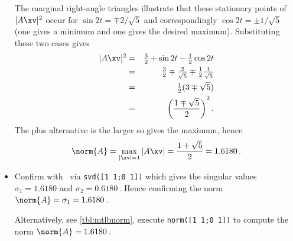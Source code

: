\begin{example}
\begin{itemize}
The marginal right-angle triangles illustrate that these stationary points of~\(|A\xv|^2\) occur for \(\sin 2t=\mp2/\sqrt5\) and correspondingly \(\cos2t=\pm1/\sqrt5\) (one gives a minimum and one gives the desired maximum).
Substituting these two cases gives
\begin{eqnarray*}
|A\xv|^2&=&\tfrac32+\sin 2t-\tfrac12\cos 2t
\\&=&\tfrac32\mp\tfrac2{\sqrt5}\mp\tfrac12\tfrac1{\sqrt5}
\\&=&\tfrac12(3\mp\sqrt5)
\\&=&\left(\frac{1\mp\sqrt5}2\right)^2.
\end{eqnarray*}
The plus alternative is the larger so gives the maximum, hence
\begin{equation*}
\norm{A}=\max_{|\xv|=1}|A\xv|=\frac{1+\sqrt5}2=1.6180\,.
\end{equation*}
\item Confirm with \script\ via \verb|svd([1 1;0 1])| which gives the singular values \(\sigma_1=1.6180\) and \(\sigma_2=0.6180\)\,.
Hence confirming the norm \(\norm{A}=\sigma_1=1.6180\)\,.

Alternatively, see \autoref{tbl:mtlbnorm}, execute \verb|norm([1 1;0 1])| to compute the norm \(\norm{A}=1.6180\)\,.
\end{itemize}
\end{example}




